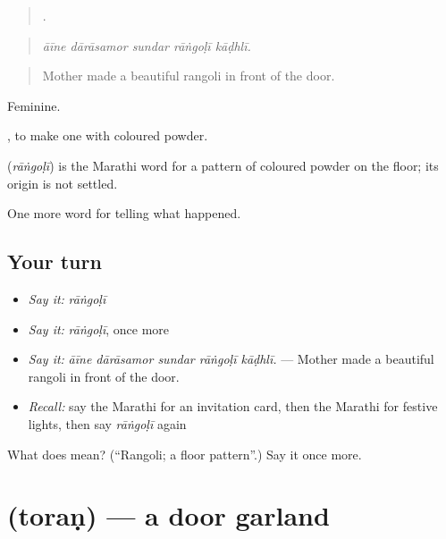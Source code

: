 \begin{quote}
    .
\end{quote}

\begin{quote}
\emph{āīne dārāsamor sundar rāṅgoḷī kāḍhlī.}
\end{quote}

\begin{quote}
Mother made a beautiful rangoli in front of the door.
\end{quote}

Feminine.

 , to make one with coloured powder.

\begin{cousinweb}
\textbf{} (\emph{rāṅgoḷī}) is the Marathi word for a pattern of coloured powder on the floor; its origin is not settled.
\end{cousinweb}

\begin{grammarlens}[title={What you've built}]
One more word for telling what happened.
\end{grammarlens}

\subsection*{Your turn}
\begin{itemize}
\raggedright
  \item \emph{Say it:} \emph{rāṅgoḷī}
  \item \emph{Say it:} \emph{rāṅgoḷī}, once more
  \item \emph{Say it:} \emph{āīne dārāsamor sundar rāṅgoḷī kāḍhlī.} — Mother made a beautiful rangoli in front of the door.
  \item \emph{Recall:} say the Marathi for an invitation card, then the Marathi for festive lights, then say \emph{rāṅgoḷī} again
\end{itemize}

\begin{tcolorbox}[breakable,colback=teal!4,colframe=teal!35!black,title={Before you move on}]
What does  mean? (\textquotedblleft{}Rangoli; a floor pattern\textquotedblright{}.) Say it once more.
\end{tcolorbox}
\section[\texorpdfstring{\mr{तोरण} (toraṇ)}{तोरण (toraṇ)}]{ (toraṇ) — a door garland}

